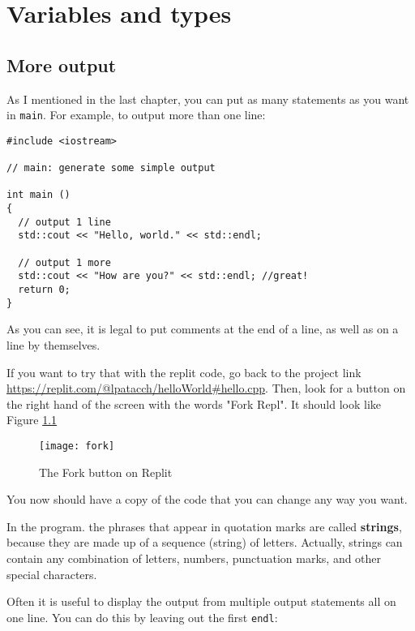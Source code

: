 

\chapter{Variables and types}

\section{More output}

As I mentioned in the last chapter, you can put as many statements as
you want in {\tt main}.  For example, to output more than one line:

\begin{lstlisting}
#include <iostream>

// main: generate some simple output

int main ()
{
  // output 1 line
  std::cout << "Hello, world." << std::endl; 
  
  // output 1 more
  std::cout << "How are you?" << std::endl; //great!  
  return 0;
}
\end{lstlisting}

As you can see, it is legal to put comments at the
end of a line, as well as on a line by themselves.

If you want to try that with the replit code, go back to the project link 
\url{https://replit.com/@lpatacch/helloWorld#hello.cpp}. Then, look for a button on the right hand of the screen with the words "Fork Repl". It should look like Figure \ref{fig:fork}
\begin{figure}
    \centering
    \texttt{[image: fork]}
    \caption{The Fork button on Replit}
    \label{fig:fork}
\end{figure}
You now should have a copy of the code that you can change any way you want.


In the program. the phrases that appear in quotation marks are called {\bf strings},
because they are made up of a sequence (string) of letters.  Actually,
strings can contain any combination of letters, numbers, punctuation
marks, and other special characters.


Often it is useful to display the output from multiple output
statements all on one line.  You can do this by leaving out
the first {\tt endl}:

